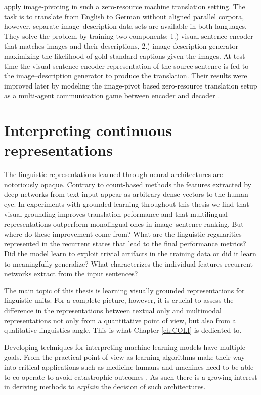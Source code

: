 \cite{nakayama2017zero} apply image-pivoting in such a zero-resource machine
translation setting. The task is to translate from English to German without
aligned parallel corpora, however, separate image--description data sets are
available in both languages. They solve the problem by
training two components: 1.) visual-sentence encoder that matches images and their descriptions,
2.) image-description generator maximizing the likelihood of gold standard captions given the images.
At test time the visual-sentence encoder representation of the source sentence is fed to the
image--description generator to produce the translation.
Their results were improved later by modeling
the image-pivot based zero-resource translation setup as a
multi-agent communication game between encoder and decoder
\citep{chen2018zero,lee2017emergent}.


\section{Interpreting continuous representations}
\label{sec:interpret}
The linguistic representations learned through neural architectures are notoriously opaque.
Contrary to count-based methods the features extracted by deep networks from text input
appear as arbitrary dense vectors to the human eye.
In experiments with grounded learning throughout this thesis we find that visual grounding
improves translation peformance and that multilingual representations outperform monolingual
ones in image--sentence ranking.
But where do these improvement come from? What are the linguistic
regularities represented in the recurrent states that lead to the final performance metrics?
Did the model learn to exploit trivial artifacts in the training data or did it learn to meaningfully generalize?
What characterizes the individual features recurrent networks extract from the input sentences?

The main topic of this thesis is learning visually grounded representations for linguistic units.
For a complete picture, however, it is crucial to assess the difference in the representations
between textual only and multimodal representations not only from a quantitative point of view,
but also from a qualitative linguistics angle.
This is what Chapter \ref{ch:COLI} is dedicated to.

Developing techniques for interpreting machine learning models have multiple goals.
From the practical point of view as learning algorithms make their way into critical applications
such as medicine humans and machines need to be able to co-operate to avoid catastrophic
outcomes \citep{caruana2015intelligible}. As such there is a growing interest in deriving methods
to \emph{explain} the decision of such architectures.


